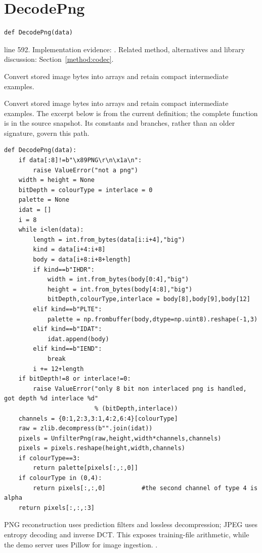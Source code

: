 \section{DecodePng}\label{fn:train:DecodePng}
\begin{lstlisting}[style=sig]
def DecodePng(data)
\end{lstlisting}
 line 592. Implementation evidence: \cite{code2026}. Related method, alternatives and library discussion: Section~\ref{method:codec}.


Convert stored image bytes into arrays and retain compact intermediate examples.


Convert stored image bytes into arrays and retain compact intermediate examples. The excerpt below is from the current definition; the complete function is in the source snapshot. Its constants and branches, rather than an older signature, govern this path.


\begin{lstlisting}[style=plain]
def DecodePng(data):
    if data[:8]!=b"\x89PNG\r\n\x1a\n":
        raise ValueError("not a png")
    width = height = None
    bitDepth = colourType = interlace = 0
    palette = None
    idat = []
    i = 8
    while i<len(data):
        length = int.from_bytes(data[i:i+4],"big")
        kind = data[i+4:i+8]
        body = data[i+8:i+8+length]
        if kind==b"IHDR":
            width = int.from_bytes(body[0:4],"big")
            height = int.from_bytes(body[4:8],"big")
            bitDepth,colourType,interlace = body[8],body[9],body[12]
        elif kind==b"PLTE":
            palette = np.frombuffer(body,dtype=np.uint8).reshape(-1,3)
        elif kind==b"IDAT":
            idat.append(body)
        elif kind==b"IEND":
            break
        i += 12+length
    if bitDepth!=8 or interlace!=0:
        raise ValueError("only 8 bit non interlaced png is handled, got depth %d interlace %d"
                         % (bitDepth,interlace))
    channels = {0:1,2:3,3:1,4:2,6:4}[colourType]
    raw = zlib.decompress(b"".join(idat))
    pixels = UnfilterPng(raw,height,width*channels,channels)
    pixels = pixels.reshape(height,width,channels)
    if colourType==3:
        return palette[pixels[:,:,0]]
    if colourType in (0,4):
        return pixels[:,:,0]          #the second channel of type 4 is alpha
    return pixels[:,:,:3]
\end{lstlisting}
PNG reconstruction uses prediction filters and lossless decompression; JPEG uses entropy decoding and inverse DCT. This exposes training-file arithmetic, while the demo server uses Pillow for image ingestion. \cite{pngspec,jpegspec,pillowimage}.


